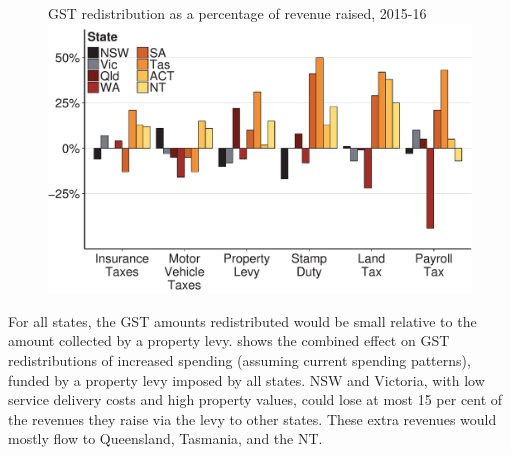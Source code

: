 \begin{figure}
%
{GST redistribution as a percentage of revenue raised, 2015-16}
\includegraphics[width=1.1\columnwidth]{Property-taxes/atlas/figure/Figure6-1.pdf}

\end{figure}

For all states, the GST amounts redistributed would be small relative to the amount collected by a property levy.  shows the combined effect on GST redistributions of increased spending (assuming current spending patterns), funded by a property levy imposed by all states. NSW and Victoria, with low service delivery costs and high property values, could lose at most 15 per cent of the revenues they raise via the levy to other states. These extra revenues would mostly flow to Queensland, Tasmania, and the NT.

